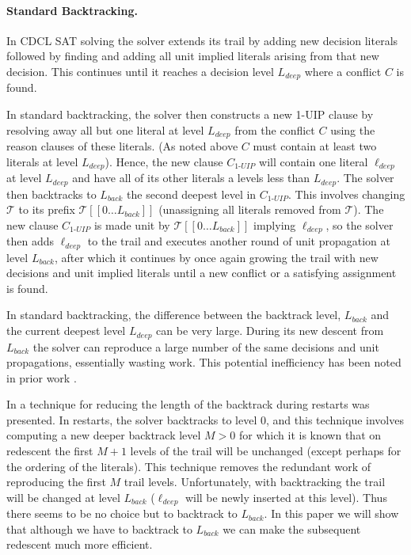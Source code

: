 \documentclass[runningheads]{llncs}
\newcommand{\sat}{SAT\xspace}
\newcommand{\trail}{\ensuremath{\mathcal{T}}}
\newcommand{\range}[2]{#1\ldots#2}
\newcommand{\uipcls}{C_{\textit{1-UIP}}}
\newcommand{\deepestLvl}{L_{\textit{deep}}}
\newcommand{\deepestLit}{\ell_{\textit{deep}}}
\newcommand{\btL}{L_{\textit{back}}}
\begin{document}
\paragraph{Standard Backtracking.}
In CDCL \sat solving the solver extends its trail by adding new
decision literals followed by finding and adding all unit implied
literals arising from that new decision. This continues until it
reaches a decision level $\deepestLvl$ where a conflict $C$ is found.

In standard backtracking, the solver then constructs a new 1-UIP
clause by resolving away all but one literal at level $\deepestLvl$
from the conflict $C$ using the reason clauses of these literals. (As
noted above $C$ must contain at least two literals at level
$\deepestLvl$). Hence, the new clause $\uipcls$ will contain one
literal $\deepestLit$ at level $\deepestLvl$ and have all of its other
literals a levels less than $\deepestLvl$. The solver then backtracks
to $\btL$ the second deepest level in $\uipcls$. This involves
changing $\trail$ to its prefix $\trail[[\range{0}{\btL}]]$
(unassigning all literals removed from $\trail$). The new clause
$\uipcls$ is made unit by $\trail[[\range{0}{\btL}]]$ implying
$\deepestLit$, so the solver then adds $\deepestLit$ to the trail and
executes another round of unit propagation at level $\btL$, after
which it continues by once again growing the trail with new decisions
and unit implied literals until a new conflict or a satisfying
assignment is found.

In standard backtracking, the difference between the backtrack level,
$\btL$ and the current deepest level $\deepestLvl$ can be very
large. During its new descent from $\btL$ the solver can reproduce a
large number of the same decisions and unit propagations, essentially
wasting work. This potential inefficiency has been noted in prior work
\cite{DBLP:journals/jsat/TakRH11,DBLP:conf/lpar/JiangZ13,DBLP:conf/sat/NadelR18,DBLP:conf/sat/MohleB19}.

In \cite{DBLP:journals/jsat/TakRH11} a technique for reducing the
length of the backtrack during restarts was presented. In restarts,
the solver backtracks to level $0$, and this technique involves
computing a new deeper backtrack level $M> 0$ for which it is known
that on redescent the first $M+1$ levels of the trail will be
unchanged (except perhaps for the ordering of the literals). This
technique removes the redundant work of reproducing the first $M$
trail levels. Unfortunately, with backtracking the trail will be
changed at level $\btL$ ($\deepestLit$ will be newly inserted at this
level). Thus there seems to be no choice but to backtrack to
$\btL$. In this paper we will show that although we have to backtrack
to $\btL$ we can make the subsequent redescent much more efficient.
\end{document}
